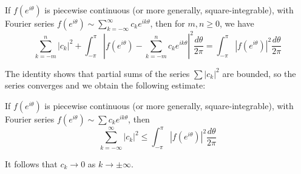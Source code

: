 \begin{theorem}
    If $f(e^{i\theta})$ is piecewise continuous (or more generally, square-integrable), with Fourier series $f(e^{i\theta}) \sim \sum_{k=-\infty}^{\infty}c_ke^{ik\theta}$, then for $m,n \geq 0$, we have \begin{equation*}
        \sum_{k=-m}^n|c_k|^2 + \int_{-\pi}^{\pi}\left|f(e^{i\theta})-\sum_{k=-m}^nc_ke^{ik\theta}\right|^2\frac{d\theta}{2\pi} = \int_{-\pi}^{\pi}|f(e^{i\theta})|^2\frac{d\theta}{2\pi}
    \end{equation*}
\end{theorem}

The identity shows that partial sums of the series $\sum |c_k|^2$ are bounded, so the series converges and we obtain the following estimate:

\begin{theorem}
    If $f(e^{i\theta})$ is piecewise continuous (or more generally, square-integrable), with Fourier series $f(e^{i\theta})\sim \sum c_ke^{ik\theta}$, then \begin{equation*}
        \sum_{k=-\infty}^{\infty}|c_k|^2 \leq \int_{-\pi}^{\pi}|f(e^{i\theta})|^2\frac{d\theta}{2\pi}
    \end{equation*}
\end{theorem}
It follows that $c_k\rightarrow 0$ as $k\rightarrow \pm \infty$.

